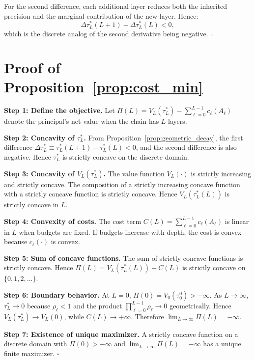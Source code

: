 For the second difference, each additional layer reduces both the inherited precision and the marginal contribution of the new layer. Hence:
\begin{equation*}
\Delta \tau^*_L(L+1) - \Delta \tau^*_L(L) < 0,
\end{equation*}
which is the discrete analog of the second derivative being negative. \hfill $\square$

\section{Proof of Proposition~\ref{prop:cost_min}}
\label{app:proof_prop4}

\textbf{Step 1: Define the objective.} Let $\Pi(L) = V_L(\tau^*_L) - \sum_{\ell=0}^{L-1} c_\ell(A_\ell)$ denote the principal's net value when the chain has $L$ layers.

\textbf{Step 2: Concavity of $\tau^*_L$.} From Proposition~\ref{prop:geometric_decay}, the first difference $\Delta \tau^*_L \equiv \tau^*_L(L+1) - \tau^*_L(L) < 0$, and the second difference is also negative. Hence $\tau^*_L$ is strictly concave on the discrete domain.

\textbf{Step 3: Concavity of $V_L(\tau^*_L)$.} The value function $V_L(\cdot)$ is strictly increasing and strictly concave. The composition of a strictly increasing concave function with a strictly concave function is strictly concave. Hence $V_L(\tau^*_L(L))$ is strictly concave in $L$.

\textbf{Step 4: Convexity of costs.} The cost term $C(L) = \sum_{\ell=0}^{L-1} c_\ell(A_\ell)$ is linear in $L$ when budgets are fixed. If budgets increase with depth, the cost is convex because $c_\ell(\cdot)$ is convex.

\textbf{Step 5: Sum of concave functions.} The sum of strictly concave functions is strictly concave. Hence $\Pi(L) = V_L(\tau^*_L(L)) - C(L)$ is strictly concave on $\{0, 1, 2, \ldots\}$.

\textbf{Step 6: Boundary behavior.} At $L = 0$, $\Pi(0) = V_0(\tau^0_0) > -\infty$. As $L \to \infty$, $\tau^*_L \to 0$ because $\rho_\ell < 1$ and the product $\prod_{\ell=0}^{L-1} \rho_\ell \to 0$ geometrically. Hence $V_L(\tau^*_L) \to V_L(0)$, while $C(L) \to +\infty$. Therefore $\lim_{L \to \infty} \Pi(L) = -\infty$.

\textbf{Step 7: Existence of unique maximizer.} A strictly concave function on a discrete domain with $\Pi(0) > -\infty$ and $\lim_{L \to \infty} \Pi(L) = -\infty$ has a unique finite maximizer. \hfill $\square$


